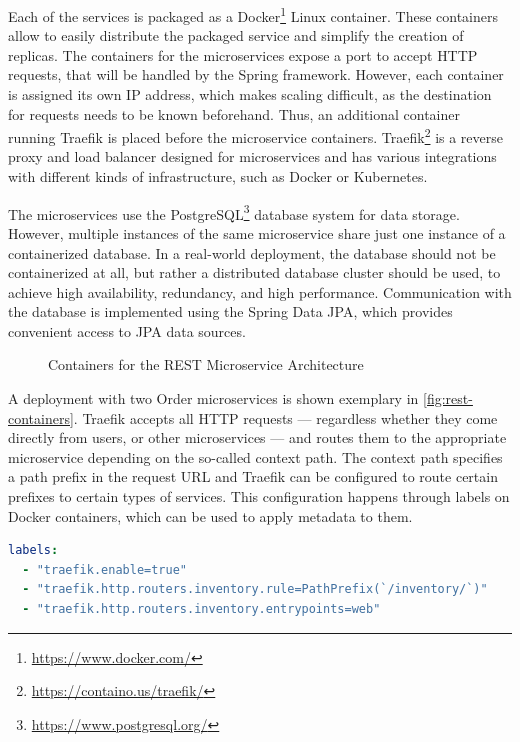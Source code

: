 Each of the services is packaged as a Docker\footnote{\url{https://www.docker.com/}} Linux container.
These containers allow to easily distribute the packaged service and simplify the creation of replicas.
The containers for the microservices expose a port to accept \ac{HTTP} requests, that will be handled by the Spring framework.
However, each container is assigned its own IP address, which makes scaling difficult, as the destination for requests needs to be known beforehand.
Thus, an additional container running Traefik is placed before the microservice containers.
Traefik\footnote{\url{https://containo.us/traefik/}} is a reverse proxy and load balancer designed for microservices and has various integrations with different kinds of infrastructure, such as Docker or Kubernetes.

The microservices use the PostgreSQL\footnote{\url{https://www.postgresql.org/}} database system for data storage.
However, multiple instances of the same microservice share just one instance of a containerized database.
In a real-world deployment, the database should not be containerized at all, but rather a distributed database cluster should be used, to achieve high availability, redundancy, and high performance.
Communication with the database is implemented using the Spring Data \acs{JPA}, which provides convenient access to \ac{JPA} data sources.

\begin{figure}[!htb]
    \centering
    
    \caption{Containers for the \acs{REST} Microservice Architecture}\label{fig:rest-containers}
\end{figure}

A deployment with two Order microservices is shown exemplary in \autoref{fig:rest-containers}.
Traefik accepts all \ac{HTTP} requests --- regardless whether they come directly from users, or other microservices --- and routes them to the appropriate microservice depending on the so-called context path.
The context path specifies a path prefix in the request \ac{URL} and Traefik can be configured to route certain prefixes to certain types of services.
This configuration happens through labels on Docker containers, which can be used to apply metadata to them.


\begin{lstlisting}[caption={Traefik Configuration for the Inventory Service}, showlines=true, label=lst:traefik-docker, language=yaml]
labels:
  - "traefik.enable=true"
  - "traefik.http.routers.inventory.rule=PathPrefix(`/inventory/`)"
  - "traefik.http.routers.inventory.entrypoints=web"
\end{lstlisting}

